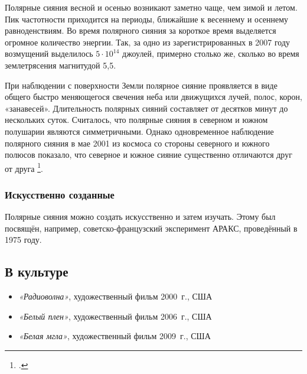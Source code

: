 \documentclass[a4paper,14pt]{article}
\begin{document}
				Полярные сияния весной и осенью возникают заметно чаще, чем зимой и летом. Пик частотности приходится на периоды, ближайшие к весеннему и осеннему равноденствиям. Во время полярного сияния за короткое время выделяется огромное количество энергии. Так, за одно из зарегистрированных в 2007 году возмущений выделилось $5 \cdot 10^{14}$ джоулей, примерно столько же, сколько во время землетрясения магнитудой 5,5.
				
				При наблюдении с поверхности Земли полярное сияние проявляется в виде общего быстро меняющегося свечения неба или движущихся лучей, полос, корон, «занавесей». Длительность полярных сияний составляет от десятков минут до нескольких суток. Считалось, что полярные сияния в северном и южном полушарии являются симметричными. Однако одновременное наблюдение полярного сияния в мае 2001 из космоса со стороны северного и южного полюсов показало, что северное и южное сияние существенно отличаются друг от друга \footcite{krusei2009}.
				
				\subsubsection*{Искусственно созданные}
				
				Полярные сияния можно создать искусственно и затем изучать. Этому был посвящён, например, советско-французский эксперимент АРАКС, проведённый в 1975 году.
				
				\subsection*{В культуре}
				
				\begin{itemize}
					\newcommand \BlueBullet{\item[\color{blue}{\textbullet}]}
					\BlueBullet \textit{«Радиоволна»}, художественный фильм 2000~г., США
					\BlueBullet \textit{«Белый плен»}, художественный фильм 2006~г., США
					\BlueBullet \textit{«Белая мгла»}, художественный фильм 2009~г., США
				\end{itemize}	
				
				\renewcommand{\refname}{Литература}
				\nocite{aleksandrov2001, bulat1974, zvereva1988, isaev1980, muzin1983, mishin1989}
				\printbibliography[nottype=online]
				\addcontentsline{toc}{subsection}{\refname}
				
			
\end{document}
